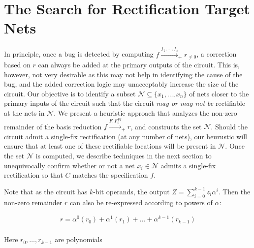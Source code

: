 \section{The Search for Rectification Target Nets}

In principle, once a bug is detected by computing
$f\xrightarrow{f_1,\dots,f_s}_+r_{\neq 0}$, a correction based on $r$
can always be added at the primary outputs of the circuit. This is,
however, not very desirable as this may not help in identifying the
cause of the bug, and the added correction logic may unacceptably
increase the size of the circuit. Our objective is to identify a subset
$\mathcal{N} \subseteq \{x_1,\dots,x_n\}$ of nets closer to the
primary inputs of the circuit such that the circuit {\it may or may
  not be} rectifiable at the nets in $\mathcal{N}$. We present a
heuristic approach that analyzes the non-zero remainder of the
\Grobner basis reduction $f\xrightarrow{F,F_{0}^{PI}}_+r$, and
constructs the set $\mathcal{N}$. Should the circuit admit a
single-fix rectification (at any number of nets), our heurustic will
ensure that at least one of these rectifiable locations will be
present in $\mathcal{N}$. Once the set $\mathcal{N}$ is computed, we
describe techniques in the next section to unequivocally confirm
whether or not a net $x_i \in \mathcal{N}$ admits a single-fix
rectification so that $C$ matches the specification $f$. 

Note that as the circuit has $k$-bit operands, the output $Z =
\sum_{i=0}^{k-1} z_i \alpha^i$. Then the non-zero remainder $r$ can
also be re-expressed according to powers of $\alpha$:

\begin{align}
r = \alpha^0 (r_0) + \alpha^1 (r_1) + \dots + \alpha^{k-1} (r_{k-1})\\
\end{align}

Here $r_0,\dots, r_{k-1}$ are polynomials
